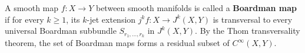 A smooth map $f: X \to Y$ between smooth manifolds is called a \textbf{Boardman map} if for every $k \ge 1$, its $k$-jet extension $j^k f: X \to J^k(X, Y)$ is transversal to every universal Boardman subbundle $S_{r_1,\ldots,r_k}$ in $J^k(X, Y)$. By the Thom transversality theorem, the set of Boardman maps forms a residual subset of $C^\infty(X, Y)$.
